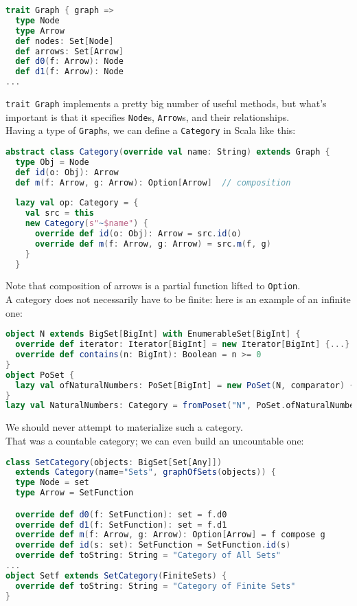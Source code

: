\documentclass[10pt]{asme2ej}
\begin{document}
\begin{lstlisting}[language=Scala]
trait Graph { graph =>
  type Node
  type Arrow
  def nodes: Set[Node]
  def arrows: Set[Arrow]
  def d0(f: Arrow): Node
  def d1(f: Arrow): Node
...
\end{lstlisting}

\verb+trait Graph+ implements a pretty big number of useful methods, but what's important is that it specifies \verb+Node+s, \verb+Arrow+s, and their relationships.\\

Having a type of \verb+Graph+s, we can define a \verb`Category` in Scala like this:

\begin{lstlisting}[language=Scala]
abstract class Category(override val name: String) extends Graph {
  type Obj = Node
  def id(o: Obj): Arrow
  def m(f: Arrow, g: Arrow): Option[Arrow]  // composition
  
  lazy val op: Category = {
    val src = this
    new Category(s"~$name") {
      override def id(o: Obj): Arrow = src.id(o)
      override def m(f: Arrow, g: Arrow) = src.m(f, g)
    }
  }
\end{lstlisting}

Note that composition of arrows is a partial function lifted to \verb+Option+.\\

A category does not necessarily have to be finite: here is an example of an infinite one:

\begin{lstlisting}[language=Scala]
object N extends BigSet[BigInt] with EnumerableSet[BigInt] {
  override def iterator: Iterator[BigInt] = new Iterator[BigInt] {...}
  override def contains(n: BigInt): Boolean = n >= 0
}
object PoSet {
  lazy val ofNaturalNumbers: PoSet[BigInt] = new PoSet(N, comparator) {...}
}
lazy val NaturalNumbers: Category = fromPoset("N", PoSet.ofNaturalNumbers)
\end{lstlisting}

We should never attempt to materialize such a category. \\

That was a countable category; we can even build an uncountable one:

\begin{lstlisting}[language=Scala]
class SetCategory(objects: BigSet[Set[Any]])
  extends Category(name="Sets", graphOfSets(objects)) {
  type Node = set
  type Arrow = SetFunction

  override def d0(f: SetFunction): set = f.d0
  override def d1(f: SetFunction): set = f.d1
  override def m(f: Arrow, g: Arrow): Option[Arrow] = f compose g
  override def id(s: set): SetFunction = SetFunction.id(s)
  override def toString: String = "Category of All Sets"
...
object Setf extends SetCategory(FiniteSets) {
  override def toString: String = "Category of Finite Sets"
}
\end{lstlisting}
\end{document}
